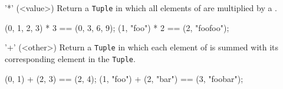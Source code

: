 \begin{urbiscriptapi}
\item['*'](<value>)%
  Return a \lstinline|Tuple| in which all elements of \this are multiplied
  by a .

\begin{urbiassert}
(0, 1, 2, 3) * 3 == (0, 3, 6, 9);
(1, "foo") * 2 == (2, "foofoo");
\end{urbiassert}

\item['+'](<other>)%
  Return a \lstinline|Tuple| in which each element of \this is summed with
  its corresponding element in the  \lstinline|Tuple|.

\begin{urbiassert}
(0, 1) + (2, 3) == (2, 4);
(1, "foo") + (2, "bar") == (3, "foobar");
\end{urbiassert}


\end{urbiscriptapi}



